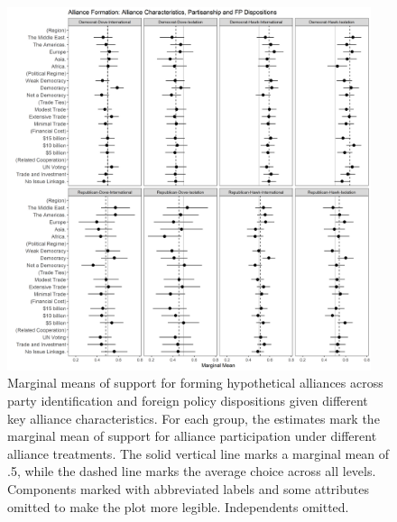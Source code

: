 \documentclass[12pt]{article}
\begin{document}
\begin{figure}
	\centering
		\includegraphics[width=0.95\textwidth]{party-dispo-form-char.png}
	\caption{Marginal means of support for forming hypothetical alliances across party identification and foreign policy dispositions given different key alliance characteristics. For each group, the estimates mark the marginal mean of support for alliance participation under different alliance treatments. The solid vertical line marks a marginal mean of .5, while the dashed line marks the average choice across all levels. Components marked with abbreviated labels and some attributes omitted to make the plot more legible. Independents omitted.}
	\label{fig:party-dispo-form-char}
\end{figure}
\end{document}
